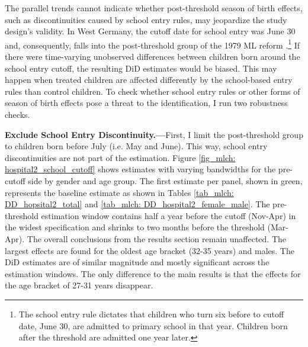 The parallel trends cannot indicate whether post-threshold season of birth effects, such as discontinuities caused by school entry rules, may jeopardize the study design's validity. In West Germany, the cutoff date for school entry was June 30 and, consequently, falls into the post-threshold group of the 1979 ML reform \citep{juerges2011}.\footnote{The school entry rule dictates that children who turn six before to cutoff date, June 30, are admitted to primary school in that year. Children born after the threshold are admitted one year later.} If there were time-varying unobserved differences between children born around the school entry cutoff, the resulting DiD estimates would be biased. This may happen when treated children are affected differently by the school-based entry rules than control children. To check whether school entry rules or other forms of season of birth effects pose a threat to the identification, I run two robustness checks.

\textbf{Exclude School Entry Discontinuity.---}First, I limit the post-threshold group to children born before July (i.e. May and June). This way, school entry discontinuities are not part of the estimation. Figure \ref{fig_mlch: hospital2_school_cutoff} shows estimates with varying bandwidths for the pre-cutoff side by gender and age group. The first estimate per panel, shown in green, represents the baseline estimate as shown in Tables \ref{tab_mlch: DD_hopsital2_total} and \ref{tab_mlch: DD_hospital2_female_male}. The pre-threshold estimation window contains half a year before the cutoff (Nov-Apr) in the widest specification and shrinks to two months before the threshold (Mar-Apr). The overall conclusions from the results section remain unaffected. The largest effects are found for the oldest age bracket (32-35 years) and males. The DiD estimates are of similar magnitude and mostly significant across the estimation windows. The only difference to the main results is that the effects for the age bracket of 27-31 years disappear.

